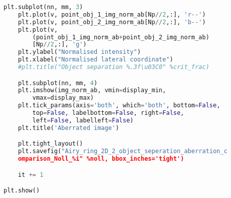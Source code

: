 \begin{lstlisting}[language=Python]
	plt.subplot(nn, mm, 3)
	plt.plot(v, point_obj_1_img_norm_ab[Np//2,:], 'r--')
	plt.plot(v, point_obj_2_img_norm_ab[Np//2,:], 'b--')
	plt.plot(v, 
		(point_obj_1_img_norm_ab+point_obj_2_img_norm_ab)
		[Np//2,:], 'g')
	plt.ylabel("Normalised intensity")
	plt.xlabel("Normalised lateral coordinate")
	#plt.title("Object separation %.3f\u03C0" %crit_frac)

	plt.subplot(nn, mm, 4)
	plt.imshow(img_norm_ab, vmin=display_min, 
		vmax=display_max)
	plt.tick_params(axis='both', which='both', bottom=False, 
		top=False, labelbottom=False, right=False, 
		left=False, labelleft=False)
	plt.title('Aberrated image')

	plt.tight_layout()
	plt.savefig("Airy_ring_2D_2_object_seperation_aberration_c
	omparison_Noll_%i" %noll, bbox_inches='tight')

	it += 1

plt.show()
\end{lstlisting}
